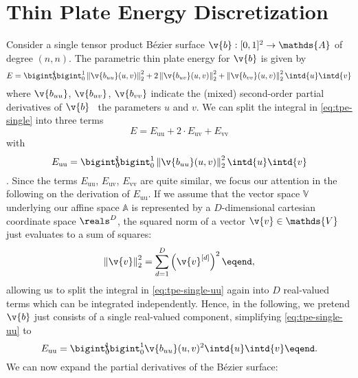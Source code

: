 \chapter{Thin Plate Energy Discretization}\label{sec:thin-plate-energy-discretization}
Consider a single tensor product B{\'e}zier surface
$\v{b} : [0,1]^2 \to \mathds{A}$ of degree $(n,n)$. The parametric thin plate
energy for $\v{b}$ is given by
\begin{equation}\label{eq:tpe-single}
  E = \bigint_0^1 \!\!\! \bigint_0^1 \left\| \v{b_{uu}}(u,v) \right\|_2^2 + 2 \left\| \v{b_{uv}}(u,v) \right\|_2^2 + \left\| \v{b_{vv}}(u,v) \right\|_2^2 \intd{u} \intd{v}
\end{equation}
where $\v{b_{uu}}$, $\v{b_{uv}}$, $\v{b_{vv}}$ indicate the (mixed)
second-order partial derivatives of $\v{b}$ \wrt\ the parameters $u$ and $v$.
We can split the integral in \cref{eq:tpe-single} into three terms
\begin{equation*}
  E = E_\mathrm{uu} + 2 \cdot E_\mathrm{uv} + E_\mathrm{vv}
\end{equation*}
with
\begin{equation}\label{eq:tpe-single-uu}
  E_\mathrm{uu} = \bigint_0^1 \!\!\! \bigint_0^1 \left\| \v{b_{uu}}(u,v) \right\|_2^2  \intd{u} \intd{v}
\end{equation}
\etc. Since the terms $E_\mathrm{uu}$, $E_\mathrm{uv}$, $E_\mathrm{vv}$ are
quite similar, we focus our attention in the following on the derivation of
$E_\mathrm{uu}$. If we assume that the vector space $\mathds{V}$ underlying our affine
space $\mathds{A}$ is represented by a $D$-dimensional cartesian coordinate space
$\reals^D$, the squared norm of a vector $\v{v} \in \mathds{V}$ just evaluates to
a sum of squares:
\begin{equation*}
  \left\| \v{v} \right\|_2^2 = \sum_{d=1}^D \left( \v{v}^{[d]} \right)^2 \eqend ,
\end{equation*}
allowing us to split the integral in \cref{eq:tpe-single-uu} again into $D$
real-valued terms which can be integrated independently. Hence, in the
following, we pretend $\v{b}$ just consists of a single real-valued component,
simplifying \cref{eq:tpe-single-uu} to
\begin{equation*}
  E_\mathrm{uu} = \bigint_0^1 \!\!\! \bigint_0^1 \v{b_{uu}}(u,v)^2  \intd{u} \intd{v} \eqend .
\end{equation*}
We can now expand the partial derivatives of the B{\'e}zier surface:
